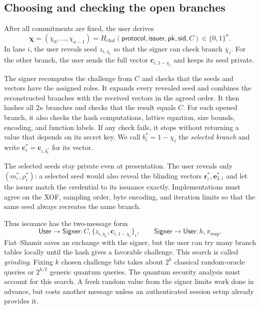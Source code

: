 \documentclass[10pt]{article}
\begin{document}
\subsection{Choosing and checking the open branches}

After all commitments are fixed, the user derives
\[
 \boldsymbol\chi=(\chi_0,\ldots,\chi_{\kappa-1})
 =H_{\mathrm{chal}}(\mathsf{protocol},\mathsf{issuer},\mathsf{pk},
   \mathsf{sid},C)
 \in\{0,1\}^{\kappa}.
\]
In lane $i$, the user reveals seed $z_{i,\chi_i}$ so that the signer can
check branch $\chi_i$.  For the other branch, the user sends the full vector
$\mathbf c_{i,1-\chi_i}$ and keeps its seed private.

The signer recomputes the challenge from $C$ and checks that the seeds and
vectors have the assigned roles.  It expands every revealed seed and combines
the reconstructed branches with the received vectors in the agreed order.
It then hashes all $2\kappa$ branches and checks that the result equals $C$.
For each opened branch, it also checks the hash computations, lattice
equation, size bounds, encoding, and function labels.  If any check fails,
it stops without returning a value that depends on its secret key.  We call
$b_i^*=1-\chi_i$ the \emph{selected branch} and write
$\mathbf c_i^*=\mathbf c_{i,b_i^*}$ for its vector.

The selected seeds stay private even at presentation.  The user reveals only
$(m_i^*,\rho_i^*)$: a selected seed would also reveal the blinding vectors
$\mathbf r_i^*,\mathbf e_{2,i}^*$ and let the issuer match the credential to
its issuance exactly.  Implementations must agree on the XOF, sampling
order, byte encoding, and iteration limits so that the same seed always
recreates the same branch.

Thus issuance has the two-message form
\[
 \mathsf{User}\longrightarrow\mathsf{Signer}:
 C,
 \{z_{i,\chi_i},\mathbf c_{i,1-\chi_i}\}_i,
 \qquad
 \mathsf{Signer}\longrightarrow\mathsf{User}:h,\pi_{\mathrm{resp}}.
\]
Fiat--Shamir saves an exchange with the signer, but the user can try many
branch tables locally until the hash gives a favorable challenge.  This
search is called \emph{grinding}.  Fixing $k$ chosen challenge bits takes
about $2^k$ classical random-oracle queries or $2^{k/2}$ generic quantum
queries.  The quantum security analysis must account for this search.  A
fresh random value from the signer limits work done in advance, but costs
another message unless an authenticated session setup already provides it.
\end{document}
